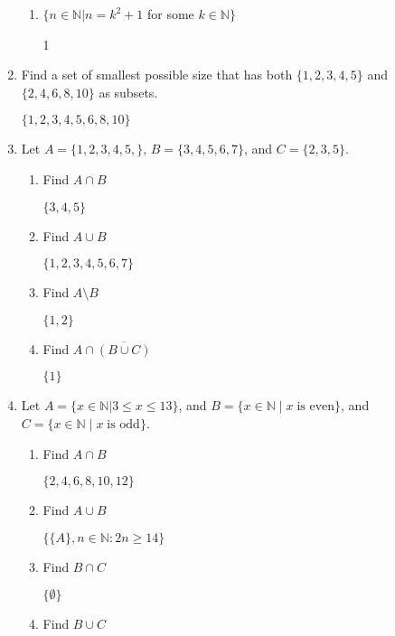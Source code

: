 \documentclass[11pt, a4paper]{article}
\newcommand\setItemNumber[1]{\setcounter{enumi}{\numexpr#1-1\relax}}
\begin{document}
\begin{enumerate}
\begin{enumerate}
            \item $\{n \in\mathbb{N}| n = k^2 +1$ for some $k\in\mathbb{N}\}$

                1

        \end{enumerate}

    \setItemNumber{5}
    \item Find a set of smallest possible size that has both $\{1,2,3,4,5\}$ and $\{2,4,6,8,10\}$ as subsets.

        $\{1,2,3,4,5,6,8,10\}$

    \setItemNumber{8}
    \item Let $A = \{1,2,3,4,5,\}$, $B = \{3,4,5,6,7\}$, and $C = \{2,3,5\}$.
        \begin{enumerate}
            \item Find $A\cap B$

                $\{3,4,5\}$

            \item Find $A\cup B$

                $\{1,2,3,4,5,6,7\}$

            \item Find $A\setminus B$

                $\{1,2\}$

            \item Find $A\cap\overline{(B\cup C)}$

                $\{1\}$

        \end{enumerate}

    \setItemNumber{10}
\item Let $A = \{x\in\mathbb{N}| 3\leq x\leq13\}$, and $B = \{x\in\mathbb{N}\;|\;x\; \text{is even}\}$, and $C = \{x\in\mathbb{N}\;|\;x\; \text{is odd}\}$.
        \begin{enumerate}
            \item Find $A\cap B$

                $\{2,4,6,8,10,12\}$

            \item Find $A\cup B$

            $\{\{A\}, n\in\mathbb{N}:2n \geq 14\}$

            \item Find $B\cap C$

                $\{\emptyset\}$

            \item Find $B\cup C$


\end{enumerate}
\end{enumerate}
\end{document}
